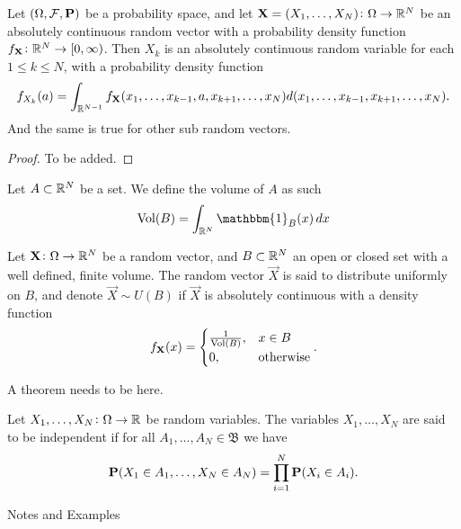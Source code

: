 \documentclass[11pt,a4paper]{article}
\begin{document}
  \begin{theorem}\label{thm:randvec}
    Let $(\Omega, \mathcal F, \mathbf{P})$ be a probability space, 
    and let $\boldsymbol{\mathbf{X}} = (X_1,\dots,X_N) \colon \Omega \to \mathbb{R}^N$ be an absolutely
    continuous random vector with a probability density function 
    $f_{\boldsymbol{\mathbf{X}}} \colon \mathbb{R}^N \to [0,\infty)$.
    Then $X_k$ is an absolutely continuous random variable for each
    $1 \le k \le N$, with a probability density function
    \[
      f_{X_{k}}(a) = 
      \int_{\mathbb{R}^{N-1}} 
      f_{\boldsymbol{\mathbf{X}}}(x_{1},\dots,x_{k-1},a,x_{k+1},\dots,x_{N})
      d(x_{1},\ldots,x_{k-1},x_{k+1},\dots,x_{N}).
    \]
    And the same is true for other sub random vectors.
  \end{theorem}
  \begin{proof}
    To be added.
  \end{proof}
  
  \begin{definition}[Volume]
    Let $A \subset \mathbb{R}^N$ be a set. We define the volume of $A$ as such
    \[
      \Vol(B) = \int_{\R^N} \mathbbm{1}_B(x)\,dx
    \]
  \end{definition}
  
  \begin{definition}
    Let $\boldsymbol{\mathbf{X}} \colon \Omega \to \mathbb{R}^N$ be a random vector, 
    and $B \subset \mathbb{R}^N$ an open or closed set with a well defined, finite volume.
    The random vector $\vec{X}$ is said to distribute uniformly on $B$, and
    denote $\vec{X} \sim U(B)$ if $\vec{X}$ is absolutely continuous with a 
    density function
    \[
      f_{\boldsymbol{\mathbf{X}}}(x) =
      \begin{cases}
        \frac{1}{\operatorname{Vol}(B)}, &x \in B \\
        0, &\text{otherwise}
      \end{cases}.
    \]
  \end{definition}

  A theorem needs to be here.

  \begin{definition}[Independence]
    Let $X_1,\dots,X_N \colon \Omega \to \mathbb{R}$ be random variables.
    The variables $X_1,\dots,X_N$ are said to be independent if
    for all $A_1,\dots,A_N \in \mathfrak B$ we have
    \[
      \mathbf{P}(X_1 \in A_1, \dots, X_N \in A_N) =
      \prod_{i=1}^{N} \mathbf{P}(X_i \in A_i).
    \]
  \end{definition}

  Notes and Examples
  
\end{document}
